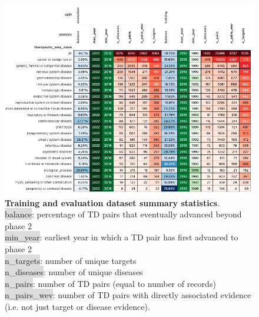 \documentclass{article}
\begin{document}
\begin{figure}[H]
  \centering
  \captionsetup{width=.9\linewidth}
  \includegraphics[width=1\textwidth]{dataset_statistics.png}
  \caption{
    \textbf{Training and evaluation dataset summary statistics}.\\\hspace{\textwidth}
    \colorbox{Gainsboro}{balance}: percentage of TD pairs that eventually advanced beyond phase 2 \\\hspace{\textwidth} 
    \colorbox{Gainsboro}{min\_year}: earliest year in which a TD pair has first advanced to phase 2 \\\hspace{\textwidth} 
    \colorbox{Gainsboro}{n\_targets}: number of unique targets \\\hspace{\textwidth} 
    \colorbox{Gainsboro}{n\_diseases}: number of unique diseases \\\hspace{\textwidth} 
    \colorbox{Gainsboro}{n\_pairs}: number of TD pairs (equal to number of records) \\\hspace{\textwidth} 
    \colorbox{Gainsboro}{n\_pairs\_wev}: number of TD pairs with directly associated evidence (i.e. not just target or disease evidence).
  }
  \label{fig:dataset_statistics}
\end{figure}

\pagebreak


\end{document}
